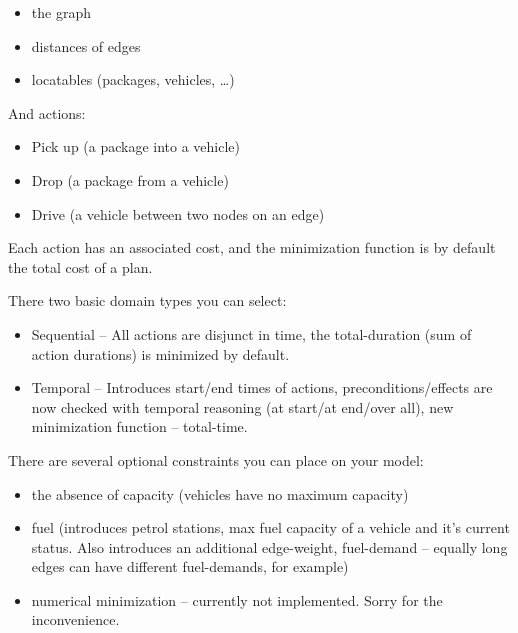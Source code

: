 \documentclass[12pt,a4paper,twoside]{article}
\begin{document}
\begin{itemize}
\item the graph

\item distances of edges

\item locatables (packages, vehicles, …)
\end{itemize}

And actions:

\begin{itemize}
\item Pick up (a package into a vehicle)

\item Drop (a package from a vehicle)

\item Drive (a vehicle between two nodes on an edge)
\end{itemize}

Each action has an associated cost, and the minimization function is by default the total cost of a plan.

There two basic domain types you can select:

\begin{itemize}
\item Sequential -- All actions are disjunct in time, the total-duration (sum of action durations) is minimized by default.

\item Temporal -- Introduces start/end times of actions,
preconditions/effects are now checked with temporal reasoning (at start/at end/over all),
new minimization function -- total-time.
\end{itemize}

There are several optional constraints you can place on your model:

\begin{itemize}
\item the absence of capacity (vehicles have no maximum capacity)

\item fuel (introduces petrol stations, max fuel capacity of a vehicle and it's current status.
Also introduces an additional edge-weight, fuel-demand -- equally long edges can have different
fuel-demands, for example)

\item numerical minimization -- currently not implemented. Sorry for the inconvenience.
\end{itemize}
\end{document}
